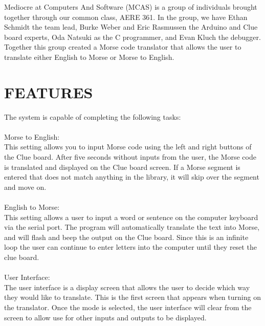 \documentclass[12pt]{article}
\begin{document}
Mediocre at Computers And Software (MCAS) is a group of individuals brought together through our common class, AERE 361. In the group, we have Ethan Schmidt the team lead, Burke Weber and Eric Rasmussen the Arduino and Clue board experts, Oda Natsuki as the C programmer, and Evan Kluch the debugger. Together this group created a Morse code translator that allows the user to translate either English to Morse or Morse to English.\\

\section{FEATURES}
The system is capable of completing the following tasks:\\
\\
Morse to English:\\
This setting allows you to input Morse code using the left and right buttons of the Clue board. 
After five seconds without inputs from the user, the Morse code is translated and displayed on the Clue board screen. If a Morse segment is entered that does not match anything in the library, it will skip over the segment and move on. \\
\\
English to Morse:\\
This setting allows a user to input a word or sentence on the computer keyboard via the serial port. The program will automatically translate the text into Morse, and will flash and beep the output on the Clue board. Since this is an infinite loop the user can continue to enter letters into the computer until they reset the clue board. \\
\\
User Interface:\\
The user interface is a display screen that allows the user to decide which way they would like to translate. This is the first screen that appears when turning on the translator. Once the mode is selected, the user interface will clear from the screen to allow use for other inputs and outputs to be displayed. \\
\end{document}
